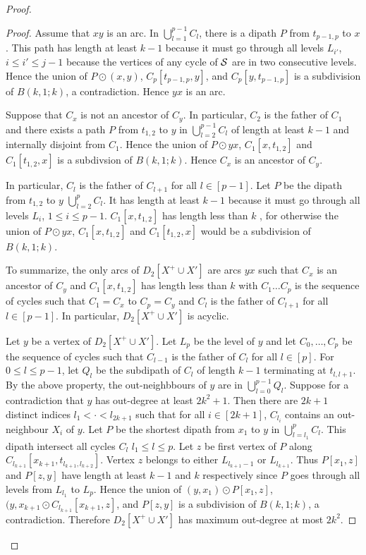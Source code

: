 \documentclass{endm}
\begin{document}
\begin{proof}
\begin{proof}
Assume that $xy$ is an arc. In $\bigcup_{l=1}^{p-1} C_l$, there is a dipath $P$ from $t_{p-1,p}$ to $x$. This path has length at least $k-1$ because
it must go through all levels $L_{i'}$, $i\leq i'\leq j-1$ because the vertices of any cycle of ${\cal S}$ are in two consecutive levels.
Hence the union of $P\odot (x,y)$, $C_p[t_{p-1,p}, y]$, and  $C_p[y,t_{p-1,p}]$ is a subdivision of $B(k,1;k)$, a contradiction.
Hence  $yx$ is an arc.


Suppose that $C_x$ is not an ancestor of $C_y$. In particular, $C_2$ is the father of $C_1$
and there exists a path $P$ from $t_{1,2}$ to $y$ in $\bigcup_{l=2}^{p-1} C_l$ of length at least $k-1$ and 
internally disjoint from $C_1$. Hence the union of $P \odot yx$, $C_1[x,t_{1,2}]$ and $C_1[t_{1,2},x]$ is a subdivsion of  $B(k,1;k)$.
Hence $C_x$ is an ancestor of $C_y$. 

In  particular, $C_l$ is the father of $C_{l+1}$ for all $l\in [p-1]$. Let $P$ be the dipath from $t_{1,2}$ 
to $y$ $\bigcup_{l=2}^{p} C_l$. It has length at least $k-1$ because it must go through all levels $L_i$, $1\leq i\leq p-1$. 
$C_1[x,t_{1,2}]$ has length less than $k$ , for otherwise the union of $P \odot yx$, $C_1[x,t_{1,2}]$ and $C_1[t_{1,2},x]$ would be a subdivision of  $B(k,1;k)$.

To summarize, the only arcs of $D_2[X^+\cup X']$ are arcs $yx$ such that $C_x$ is an ancestor of $C_y$ and $C_1[x,t_{1,2}]$ has length less than $k$ with $C_1 \dots C_p$ is the
sequence of cycles such that $C_1=C_x$ to $C_p=C_y$ and $C_l$ is the father of $C_{l+1}$ for all $l\in [p-1]$.
In particular, $D_2[X^+\cup X']$ is acyclic.

Let $y$ be a vertex of $D_2[X^+\cup X']$.
Let $L_p$ be the level of $y$ and let $C_0, \dots, C_p$ be the sequence of cycles such that $C_{l-1}$ is the father of $C_l$ for all $l\in [p]$.
For $0\leq l\leq p-1$, let $Q_l$ be the subdipath of $C_l$ of length $k-1$ terminating at $t_{l,l+1}$. By the above property, the out-neighbbours of
$y$ are in $\bigcup_{l=0}^{p-1} Q_l$.
Suppose for a contradiction that $y$ has out-degree at least $2k^2+1$. Then there are $2k+1$ distinct indices $l_1 < \cdot < l_{2k+1}$ such that for all $i\in [2k+1]$,  $C_{l_i}$ contains an out-neighbour $X_i$ of $y$.
Let $P$ be the shortest dipath from $x_1$ to $y$ in $\bigcup_{l=l_1}^p C_l$. This dipath intersect all cycles $C_l$ $l_1\leq l\leq p$. Let $z$ be first vertex of $P$ along $C_{l_{k+1}}[x_{k+1}, t_{l_{k+1}, l_{k+2}}]$. Vertex $z$ belongs to either $L_{l_{k+1}-1}$ or $L_{l_{k+1}}$.
Thus $P[x_1, z]$ and $P[z, y]$ have length at least $k-1$ and $k$ respectively since $P$ goes through all levels from $L_{l_1}$ to $L_p$. 
 Hence the union of $(y, x_1) \odot P[x_1, z]$,  $(y,x_{k+1}\odot C_{l_{k+1}}[x_{k+1},z]$, and
$P[z, y]$ is a subdivision of $B(k,1;k)$, a contradiction.
Therefore $D_2[X^+\cup X']$ has maximum out-degree at most $2k^2$. 


\end{proof}
\end{proof}
\end{document}
